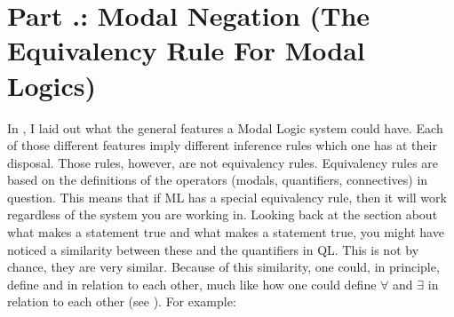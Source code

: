 \section{Part \thechapcount.\theseccount: Modal Negation (The Equivalency Rule For Modal Logics)}
In , I laid out what the general features a Modal Logic system could have. Each of those different features imply different inference rules which one has at their disposal. Those rules, however, are not equivalency rules. Equivalency rules are based on the definitions of the operators (modals, quantifiers, connectives) in question. This means that if ML has a special equivalency rule, then it will work regardless of the system you are working in. Looking back at the section about what makes a \ediamond   statement true and what makes a \ebox   statement true, you might have noticed a similarity between these and the quantifiers in QL. This is not by chance, they are very similar. Because of this similarity, one could, in principle, define \ebox   and \ediamond   in relation to each other, much like how one could define $\forall$  and $\exists$  in relation to each other (see ). For example:

